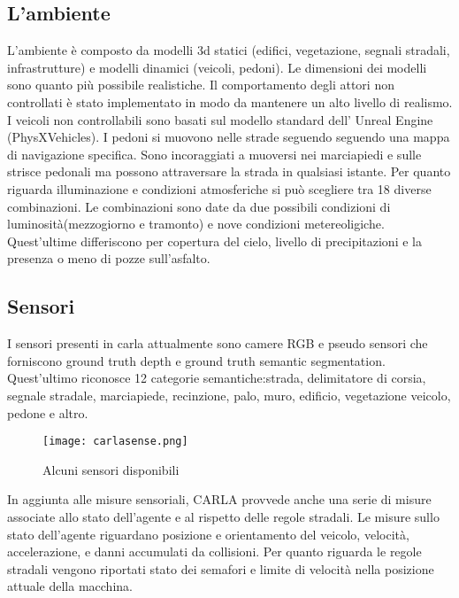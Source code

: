 \subsection{L'ambiente}
L'ambiente è composto da modelli 3d statici (edifici, vegetazione, segnali stradali, infrastrutture) e modelli dinamici (veicoli, pedoni). Le dimensioni 
dei modelli sono quanto più possibile realistiche.  Il comportamento degli attori non controllati è stato implementato in modo da mantenere un alto livello di realismo. I veicoli non controllabili
sono basati sul modello standard dell' Unreal Engine (PhysXVehicles). I pedoni si muovono nelle strade seguendo seguendo una mappa di navigazione specifica. Sono incoraggiati a muoversi nei 
marciapiedi e sulle strisce pedonali ma possono attraversare la strada in qualsiasi istante. Per quanto riguarda illuminazione e condizioni atmosferiche si può scegliere tra 18 diverse combinazioni.
Le combinazioni sono date da due possibili condizioni di luminosità(mezzogiorno e tramonto) e nove condizioni metereoligiche. Quest'ultime differiscono per copertura del cielo,
livello di precipitazioni e la presenza o meno di pozze sull'asfalto.
\subsection{Sensori}
I sensori presenti in carla attualmente sono camere RGB e pseudo sensori che forniscono ground truth depth e ground truth semantic segmentation.
Quest'ultimo riconosce 12 categorie semantiche:strada, delimitatore di corsia, segnale stradale, marciapiede, recinzione, palo, muro, edificio, vegetazione
veicolo, pedone e altro.
\begin{figure}[h]
    \texttt{[image: carlasense.png]}
    \caption{Alcuni sensori disponibili \cite{carla}}
    \label{fig:sense}
\end{figure}
In aggiunta alle misure sensoriali, CARLA provvede anche una serie di misure associate allo stato dell'agente e al rispetto delle regole stradali. Le misure 
sullo stato dell'agente riguardano posizione e orientamento del veicolo, velocità, accelerazione, e danni accumulati da collisioni. Per quanto riguarda le regole
stradali vengono riportati stato dei semafori e limite di velocità nella posizione attuale della macchina.
